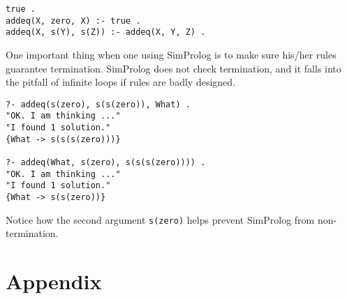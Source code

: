 \documentclass{article}
\begin{document}
\begin{verbatim}
true .
addeq(X, zero, X) :- true .
addeq(X, s(Y), s(Z)) :- addeq(X, Y, Z) .
\end{verbatim}

One important thing when one using SimProlog is to make sure his/her rules guarantee termination. SimProlog does not check termination, and it falls into the pitfall of infinite loops if rules are badly designed.

\begin{verbatim}
?- addeq(s(zero), s(s(zero)), What) .
"OK. I am thinking ..."
"I found 1 solution."
{What -> s(s(s(zero)))}

?- addeq(What, s(zero), s(s(s(zero)))) .
"OK. I am thinking ..."
"I found 1 solution."
{What -> s(s(zero))}
\end{verbatim}

Notice how the second argument {\tt s(zero)} helps prevent SimProlog from non-termination. 

\section*{Appendix}
\end{document}
